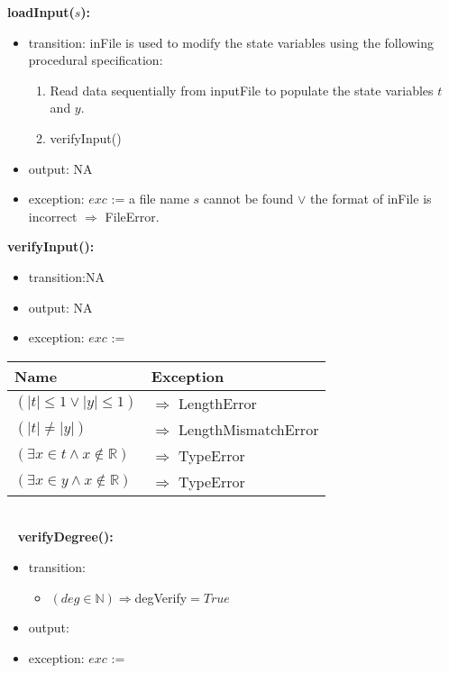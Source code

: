 \documentclass[12pt, titlepage]{article}
\begin{document}
\noindent \textbf{loadInput($s$):}
\begin{itemize}
	\item transition: {inFile} is used to modify the state variables using 
	the following procedural specification:
	
	\begin{enumerate}
		
		\item Read data sequentially from inputFile to populate the state 
		variables $t$ and $y$.
		
		\item verifyInput()
		
	\end{enumerate}
	\item output: NA
	\item exception: $exc$ := a file name $s$ cannot be found $\lor$ the format 
	of inFile is incorrect $\Longrightarrow$ FileError.
	
\end{itemize}

\noindent \textbf{verifyInput():}
\begin{itemize}
\item transition:NA
\item output: NA
\item exception: $exc$ := 
\end{itemize}

\begin{tabular}{p{10cm} p{6.75cm}}
	
	\toprule
	\textbf{Name}&\textbf{Exception}\\
	\midrule


$ (|t| \leq 1 \lor |y| \leq 1)$ & $\Longrightarrow$ LengthError\\
$ (|t| \neq |y|)$ & $\Longrightarrow$ LengthMismatchError\\
$ (\exists x \in t \land  x \notin \mathbb{R} )$ & $\Longrightarrow$ TypeError\\
$ (\exists x \in y \land  x \notin \mathbb{R} )$ & $\Longrightarrow$ TypeError\\


\bottomrule
\end{tabular}\\

~\newline
\noindent \textbf{verifyDegree():}
\begin{itemize}
	\item transition: 
	\begin{itemize}
		
		\item $(deg \in \mathbb{N})\Longrightarrow $degVerify$ = 
		True$
	\end{itemize}
	\item output: 
	\item exception: $exc$ := 
\end{itemize}
\end{document}
